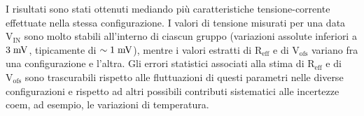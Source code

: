 I risultati sono stati ottenuti mediando pi\`u caratteristiche tensione-corrente effettuate nella stessa configurazione. I valori di tensione misurati per una data $\mathrm{V_{IN}}$ sono molto stabili all'interno di ciascun gruppo (variazioni assolute inferiori a $3\rm \; mV$, tipicamente di $\sim 1\rm \; mV$), mentre i valori estratti di $\mathrm{R_{eff}}$ e di $\mathrm{V_{ofs}}$ variano fra una configurazione e l'altra.
Gli errori statistici associati alla stima di $\mathrm{R_{eff}}$ e di $\mathrm{V_{ofs}}$ sono trascurabili rispetto alle fluttuazioni di questi parametri nelle diverse configurazioni e rispetto ad altri possibili contributi sistematici alle incertezze coem, ad esempio, le variazioni di temperatura. 

